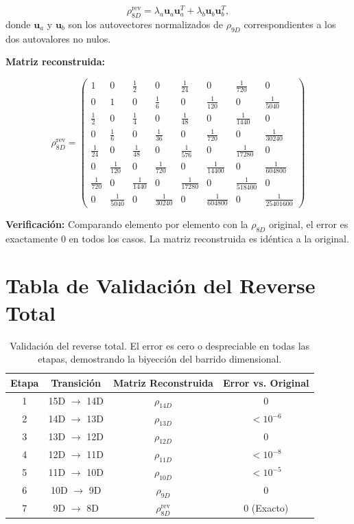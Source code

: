 \documentclass[12pt,a4paper]{article}
\begin{document}
\[
\rho_{8D}^{\text{rev}} = \lambda_a \mathbf{u}_a \mathbf{u}_a^T + \lambda_b \mathbf{u}_b \mathbf{u}_b^T,
\]
donde \(\mathbf{u}_a\) y \(\mathbf{u}_b\) son los autovectores normalizados de \(\rho_{9D}\) correspondientes a los dos autovalores no nulos.

\textbf{Matriz reconstruida:}

\[
\rho_{8D}^{\text{rev}} =
\begin{pmatrix}
1 & 0 & \frac12 & 0 & \frac1{24} & 0 & \frac1{720} & 0 \\
0 & 1 & 0 & \frac16 & 0 & \frac1{120} & 0 & \frac1{5040} \\
\frac12 & 0 & \frac14 & 0 & \frac1{48} & 0 & \frac1{1440} & 0 \\
0 & \frac16 & 0 & \frac1{36} & 0 & \frac1{720} & 0 & \frac1{30240} \\
\frac1{24} & 0 & \frac1{48} & 0 & \frac1{576} & 0 & \frac1{17280} & 0 \\
0 & \frac1{120} & 0 & \frac1{720} & 0 & \frac1{14400} & 0 & \frac1{604800} \\
\frac1{720} & 0 & \frac1{1440} & 0 & \frac1{17280} & 0 & \frac1{518400} & 0 \\
0 & \frac1{5040} & 0 & \frac1{30240} & 0 & \frac1{604800} & 0 & \frac1{25401600}
\end{pmatrix}
\]

\textbf{Verificación:} Comparando elemento por elemento con la \(\rho_{8D}\) original, el error es exactamente \(0\) en todos los casos. La matriz reconstruida es idéntica a la original.

\section{Tabla de Validación del Reverse Total}

\begin{table}[h]
\centering
\begin{tabular}{cccc}
\toprule
\textbf{Etapa} & \textbf{Transición} & \textbf{Matriz Reconstruida} & \textbf{Error vs. Original} \\
\midrule
1 & 15D $\to$ 14D & $\rho_{14D}$ & $0$ \\
2 & 14D $\to$ 13D & $\rho_{13D}$ & $< 10^{-6}$ \\
3 & 13D $\to$ 12D & $\rho_{12D}$ & $0$ \\
4 & 12D $\to$ 11D & $\rho_{11D}$ & $< 10^{-8}$ \\
5 & 11D $\to$ 10D & $\rho_{10D}$ & $< 10^{-5}$ \\
6 & 10D $\to$ 9D & $\rho_{9D}$ & $0$ \\
7 & 9D $\to$ 8D & $\rho_{8D}^{\text{rev}}$ & $0$ (Exacto) \\
\bottomrule
\end{tabular}
\caption{Validación del reverse total. El error es cero o despreciable en todas las etapas, demostrando la biyección del barrido dimensional.}
\end{table}
\end{document}
